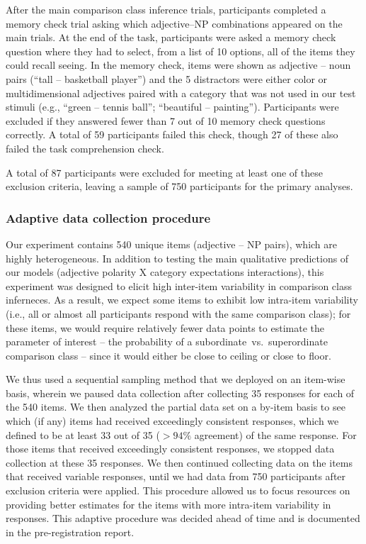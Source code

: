 \documentclass[doc]{apa6}
\begin{document}
After the main comparison class inference trials, participants completed a memory check trial asking which adjective--NP combinations appeared on the main trials. 
At the end of the task, participants were asked a memory check question where they had to select, from a list of 10 options, all of the items they could recall seeing. In the memory check, items were shown as adjective -- noun pairs (``tall -- basketball player'') and the 5 distractors were either color or multidimensional adjectives paired with a category that was not used in our test stimuli (e.g., ``green -- tennis ball''; ``beautiful -- painting'').
Participants were excluded if they answered fewer than 7 out of 10 memory check questions correctly.
A total of 59 participants failed this check, though 27 of these also failed the task comprehension check. 

A total of 87 participants were excluded for meeting at least one of these exclusion criteria, leaving a sample of 750 participants for the primary analyses.

\subsubsection{Adaptive data collection procedure}

Our experiment contains 540 unique items (adjective -- NP pairs), which are highly heterogeneous.
In addition to testing the main qualitative predictions of our models (adjective polarity X category expectations interactions), this experiment was designed to elicit high inter-item variability in comparison class inferneces.
As a result, we expect some items to exhibit low intra-item variability  (i.e., all or almost all participants respond with the same comparison class); for these items, we would require relatively fewer data points to estimate the parameter of interest -- the probability of a subordinate~vs.~superordinate comparison class -- since it would either be close to ceiling or close to floor. 

We thus used a sequential sampling method that we deployed on an item-wise basis, wherein we paused data collection after collecting 35 responses for each of the 540 items.
We then analyzed the partial data set on a by-item basis to see which (if any) items had received exceedingly consistent responses, which we defined to be at least 33 out of 35  ($>94\%$ agreement) of the same response. 
For those items that received exceedingly consistent responses, we stopped data collection at these 35 responses. 
We then continued collecting data on the items that received variable responses, until we had data from 750 participants after exclusion criteria were applied.
This procedure allowed us to focus resources on providing better estimates for the items with more intra-item variability in responses. 
This adaptive procedure was decided ahead of time and is documented in the pre-registration report. 
\end{document}
